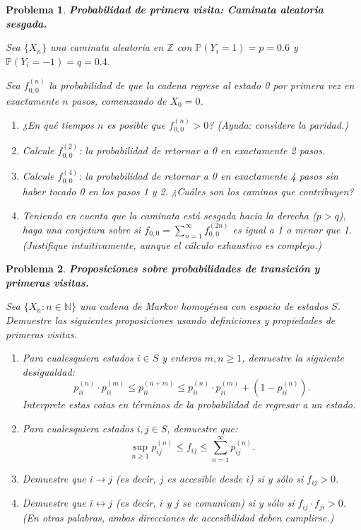 \documentclass[12pt]{article}
\newtheorem{problem}{Problema}
\begin{document}
\begin{problem}
\textbf{Probabilidad de primera visita: Caminata aleatoria sesgada.}

Sea $\{X_n\}$ una caminata aleatoria en $\mathbb{Z}$ con $\mathbb{P}(Y_i = 1) = p = 0.6$ y $\mathbb{P}(Y_i = -1) = q = 0.4$.

Sea $f_{0,0}^{(n)}$ la probabilidad de que la cadena regrese al estado 0 por primera vez en exactamente $n$ pasos, comenzando de $X_0 = 0$.

\begin{enumerate}
    \item[(a)] ¿En qué tiempos $n$ es posible que $f_{0,0}^{(n)} > 0$? (Ayuda: considere la paridad.)
    
    \item[(b)] Calcule $f_{0,0}^{(2)}$: la probabilidad de retornar a 0 en exactamente 2 pasos.
    
    \item[(c)] Calcule $f_{0,0}^{(4)}$: la probabilidad de retornar a 0 en exactamente 4 pasos sin haber tocado 0 en los pasos 1 y 2. ¿Cuáles son los caminos que contribuyen?
    
    \item[(d)] Teniendo en cuenta que la caminata está sesgada hacia la derecha ($p > q$), haga una conjetura sobre si $f_{0,0} = \sum_{n=1}^{\infty} f_{0,0}^{(2n)}$ es igual a 1 o menor que 1. (Justifique intuitivamente, aunque el cálculo exhaustivo es complejo.)
\end{enumerate}
\end{problem}

\begin{problem}
\textbf{Proposiciones sobre probabilidades de transición y primeras visitas.}

Sea $\{X_n : n \in \mathbb{N}\}$ una cadena de Markov homogénea con espacio de estados $S$. Demuestre las siguientes proposiciones usando definiciones y propiedades de primeras visitas.

\begin{enumerate}
    \item[(a)] Para cualesquiera estados $i \in S$ y enteros $m, n \geq 1$, demuestre la siguiente desigualdad:
    \[
    p_{ii}^{(n)} \cdot p_{ii}^{(m)} \leq p_{ii}^{(n+m)} \leq p_{ii}^{(n)} \cdot p_{ii}^{(m)} + \left(1 - p_{ii}^{(n)}\right).
    \]
    Interprete estas cotas en términos de la probabilidad de regresar a un estado.
    
    \item[(b)] Para cualesquiera estados $i, j \in S$, demuestre que:
    \[
    \sup_{n \geq 1} p_{ij}^{(n)} \leq f_{ij} \leq \sum_{n=1}^{\infty} p_{ij}^{(n)}.
    \]
    \item[(c)] Demuestre que $i \to j$ (es decir, $j$ es accesible desde $i$) si y sólo si $f_{ij} > 0$.
    
    \item[(d)] Demuestre que $i \leftrightarrow j$ (es decir, $i$ y $j$ se comunican) si y sólo si $f_{ij} \cdot f_{ji} > 0$. (En otras palabras, ambas direcciones de accesibilidad deben cumplirse.)
    \end{enumerate}
\end{problem}
\end{document}
